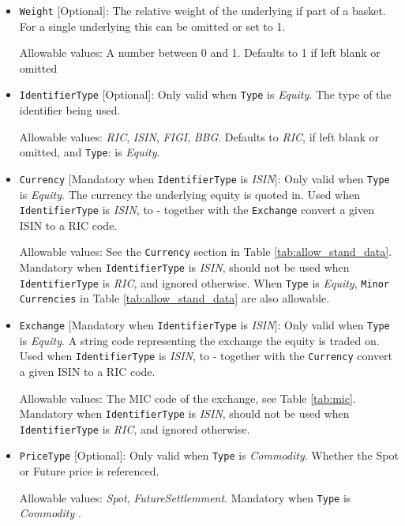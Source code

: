 \begin{itemize}
\item \lstinline!Weight! [Optional]:
The relative weight of the underlying if part of a basket. For a single underlying this can be omitted or set to 1. 

Allowable values: A number between 0 and 1. Defaults to 1 if left blank or omitted

\item \lstinline!IdentifierType! [Optional]:
Only valid when \lstinline!Type! is  \emph{Equity}. The type of the identifier being used.  

Allowable values:  \emph{RIC}, \emph{ISIN}, \emph{FIGI}, \emph{BBG}. Defaults to \emph{RIC}, if left blank or omitted, and \lstinline!Type!: is  \emph{Equity}.

\item \lstinline!Currency! [Mandatory when \lstinline!IdentifierType! is  \emph{ISIN}]: Only valid when \lstinline!Type! is  \emph{Equity}. The currency the underlying equity is quoted in. Used when \lstinline!IdentifierType! is  \emph{ISIN}, to - together with the \lstinline!Exchange!  convert a given ISIN to a RIC code.  

Allowable values: See the \lstinline!Currency! section in Table \ref{tab:allow_stand_data}. Mandatory when \lstinline!IdentifierType! is  \emph{ISIN}, should not be used when  \lstinline!IdentifierType! is  \emph{RIC}, and ignored otherwise. When \lstinline!Type! is \emph{Equity}, \lstinline!Minor Currencies! in Table \ref{tab:allow_stand_data} are also allowable.

\item \lstinline!Exchange! [Mandatory when \lstinline!IdentifierType! is  \emph{ISIN}]:
Only valid when \lstinline!Type! is  \emph{Equity}. A string code representing the exchange the equity is traded on. Used when \lstinline!IdentifierType! is  \emph{ISIN}, to - together with the \lstinline!Currency!  convert a given ISIN to a RIC code.  

Allowable values:  The MIC code of the exchange, see Table \ref{tab:mic}. Mandatory when \lstinline!IdentifierType! is  \emph{ISIN}, should not be used when  \lstinline!IdentifierType! is \emph{RIC}, and ignored otherwise.

\item \lstinline!PriceType! [Optional]:
Only valid when  \lstinline!Type! is  \emph{Commodity}.  Whether the Spot or Future price is referenced. 

Allowable values:  \emph{Spot}, \emph{FutureSettlemment}. Mandatory when  \lstinline!Type! is  \emph{Commodity} .


\end{itemize}
